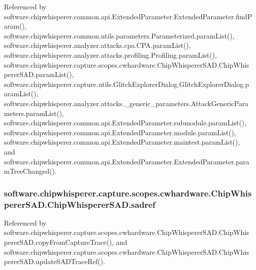 Referenced by software.\+chipwhisperer.\+common.\+api.\+Extended\+Parameter.\+Extended\+Parameter.\+find\+Param(), software.\+chipwhisperer.\+common.\+utils.\+parameters.\+Parameterized.\+param\+List(), software.\+chipwhisperer.\+analyzer.\+attacks.\+cpa.\+C\+P\+A.\+param\+List(), software.\+chipwhisperer.\+analyzer.\+attacks.\+profiling.\+Profiling.\+param\+List(), software.\+chipwhisperer.\+capture.\+scopes.\+cwhardware.\+Chip\+Whisperer\+S\+A\+D.\+Chip\+Whisperer\+S\+A\+D.\+param\+List(), software.\+chipwhisperer.\+capture.\+utils.\+Glitch\+Explorer\+Dialog.\+Glitch\+Explorer\+Dialog.\+param\+List(), software.\+chipwhisperer.\+analyzer.\+attacks.\+\_\+generic\+\_\+parameters.\+Attack\+Generic\+Parameters.\+param\+List(), software.\+chipwhisperer.\+common.\+api.\+Extended\+Parameter.\+submodule.\+param\+List(), software.\+chipwhisperer.\+common.\+api.\+Extended\+Parameter.\+module.\+param\+List(), software.\+chipwhisperer.\+common.\+api.\+Extended\+Parameter.\+maintest.\+param\+List(), and software.\+chipwhisperer.\+common.\+api.\+Extended\+Parameter.\+Extended\+Parameter.\+param\+Tree\+Changed().

\hypertarget{classsoftware_1_1chipwhisperer_1_1capture_1_1scopes_1_1cwhardware_1_1ChipWhispererSAD_1_1ChipWhispererSAD_a7eb7ada127e148e76f41e602a511510e}{}
\subsubsection[{sadref}]{\setlength{\rightskip}{0pt plus 5cm}software.\+chipwhisperer.\+capture.\+scopes.\+cwhardware.\+Chip\+Whisperer\+S\+A\+D.\+Chip\+Whisperer\+S\+A\+D.\+sadref}\label{classsoftware_1_1chipwhisperer_1_1capture_1_1scopes_1_1cwhardware_1_1ChipWhispererSAD_1_1ChipWhispererSAD_a7eb7ada127e148e76f41e602a511510e}


Referenced by software.\+chipwhisperer.\+capture.\+scopes.\+cwhardware.\+Chip\+Whisperer\+S\+A\+D.\+Chip\+Whisperer\+S\+A\+D.\+copy\+From\+Capture\+Trace(), and software.\+chipwhisperer.\+capture.\+scopes.\+cwhardware.\+Chip\+Whisperer\+S\+A\+D.\+Chip\+Whisperer\+S\+A\+D.\+update\+S\+A\+D\+Trace\+Ref().

